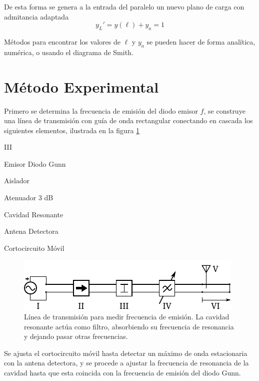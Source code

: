 \documentclass[11pt,a4paper]{article}
\begin{document}
\begin{multicols}{2}
De esta forma se genera a la entrada del paralelo un nuevo plano de carga con admitancia adaptada 
$$y_L' = y(\ell) + y_a = 1$$

Métodos para encontrar los valores de $\ell$ y $y_a$ se pueden hacer de forma analítica, numérica, o usando el diagrama de Smith.


\section{Método Experimental}

Primero se determina la frecuencia de emisión del diodo emisor $f$, se construye una línea de transmisión con guía de onda rectangular conectando en cascada los siguientes elementos, ilustrada en la figura \ref{fig:arr1}
\begin{multicols}{2}
    \begin{labeling}{III} 
        \item [I] Emisor Diodo Gunn
        \item [II] Aislador
        \item [III] Atenuador 3 dB
        \item [IV] Cavidad Resonante
        \item [V] Antena Detectora
        \item [VI] Cortocircuito Móvil
    \end{labeling}        
\end{multicols}
\begin{figure}[H]
    \centering
    \includegraphics[width=\linewidth]{Images/arreglo1.pdf}
    \caption{Línea de transmisión para medir frecuencia de emisión. La cavidad resonante actúa como filtro, absorbiendo su frecuencia de resonancia y dejando pasar otras frecuencias.}
    \label{fig:arr1}
\end{figure}
Se ajusta el cortocircuito móvil hasta detectar un máximo de onda estacionaria con la antena detectora, y se procede a ajustar la frecuencia de resonancia de la cavidad hasta que esta coincida con la frecuencia de emisión del diodo Gunn.\\


\end{multicols}
\end{document}
